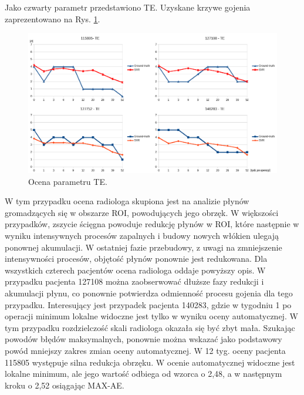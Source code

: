 Jako czwarty parametr przedstawiono TE. Uzyskane krzywe gojenia zaprezentowano na Rys. \ref{fig:TE}.
\begin{figure}[h!]
	\centering
	\includegraphics[width=1\textwidth]{figures/TE.png}
	\caption{Ocena parametru TE.}\label{fig:TE}
\end{figure}
W tym przypadku ocena radiologa skupiona jest na analizie płynów gromadzących się w obszarze ROI, powodujących jego obrzęk. W większości przypadków, zszycie ścięgna powoduje redukcję płynów w ROI, które następnie \linebreak w wyniku intensywnych procesów zapalnych i budowy nowych włókien ulegają ponownej akumulacji. W ostatniej fazie przebudowy, z uwagi na zmniejszenie intensywności procesów, objętość płynów ponownie jest redukowana. Dla wszystkich czterech pacjentów ocena radiologa oddaje powyższy opis. W przypadku pacjenta 127108 można zaobserwować dłuższe fazy redukcji i akumulacji płynu, co ponownie potwierdza odmienność procesu gojenia dla tego przypadku. Interesujący jest przypadek pacjenta 140283, gdzie w tygodniu 1 po operacji minimum lokalne widoczne jest tylko w wyniku oceny automatycznej. W tym przypadku rozdzielczość skali radiologa okazała się być zbyt mała. Szukając powodów błędów maksymalnych, ponownie można wskazać jako podstawowy powód mniejszy zakres zmian oceny automatycznej. W 12 tyg. oceny pacjenta 115805 występuje silna redukcja obrzęku. W ocenie automatycznej widoczne jest lokalne minimum, ale jego wartość odbiega od wzorca o 2,48, a w następnym kroku o 2,52 osiągając MAX-AE. 


